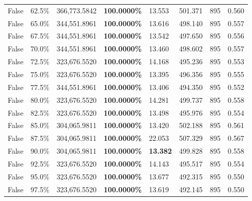 \begin{table}[H]
\begin{tabular}{lllrllll}
\cline{1-8}
False & 62.5\% & 366,773.5842 & \bfseries \color{red} 100.0000\% & 13.553 & 501.371 & 895 & 0.560 \\
\cline{1-8}
False & 65.0\% & 344,551.8961 & \bfseries \color{red} 100.0000\% & 13.616 & 498.140 & 895 & 0.557 \\
\cline{1-8}
False & 67.5\% & 344,551.8961 & \bfseries \color{red} 100.0000\% & 13.542 & 497.650 & 895 & 0.556 \\
\cline{1-8}
False & 70.0\% & 344,551.8961 & \bfseries \color{red} 100.0000\% & 13.460 & 498.602 & 895 & 0.557 \\
\cline{1-8}
False & 72.5\% & 323,676.5520 & \bfseries \color{red} 100.0000\% & 14.168 & 495.236 & 895 & 0.553 \\
\cline{1-8}
False & 75.0\% & 323,676.5520 & \bfseries \color{red} 100.0000\% & 13.395 & 496.356 & 895 & 0.555 \\
\cline{1-8}
False & 77.5\% & 344,551.8961 & \bfseries \color{red} 100.0000\% & 13.406 & 494.350 & 895 & 0.552 \\
\cline{1-8}
False & 80.0\% & 323,676.5520 & \bfseries \color{red} 100.0000\% & 14.281 & 499.737 & 895 & 0.558 \\
\cline{1-8}
False & 82.5\% & 323,676.5520 & \bfseries \color{red} 100.0000\% & 13.498 & 495.976 & 895 & 0.554 \\
\cline{1-8}
False & 85.0\% & \color{red} 304,065.9811 & \bfseries \color{red} 100.0000\% & 13.420 & 502.188 & 895 & 0.561 \\
\cline{1-8}
False & 87.5\% & \color{red} 304,065.9811 & \bfseries \color{red} 100.0000\% & 22.053 & 507.329 & 895 & 0.567 \\
\cline{1-8}
False & 90.0\% & \color{red} 304,065.9811 & \bfseries \color{red} 100.0000\% & \bfseries \color{red} 13.382 & 499.828 & 895 & 0.558 \\
\cline{1-8}
False & 92.5\% & 323,676.5520 & \bfseries \color{red} 100.0000\% & 14.143 & 495.517 & 895 & 0.554 \\
\cline{1-8}
False & 95.0\% & 323,676.5520 & \bfseries \color{red} 100.0000\% & 13.677 & 492.315 & 895 & 0.550 \\
\cline{1-8}
False & 97.5\% & 323,676.5520 & \bfseries \color{red} 100.0000\% & 13.619 & 492.145 & 895 & 0.550 \\
\cline{1-8}
\bottomrule
\end{tabular}
\end{table}
